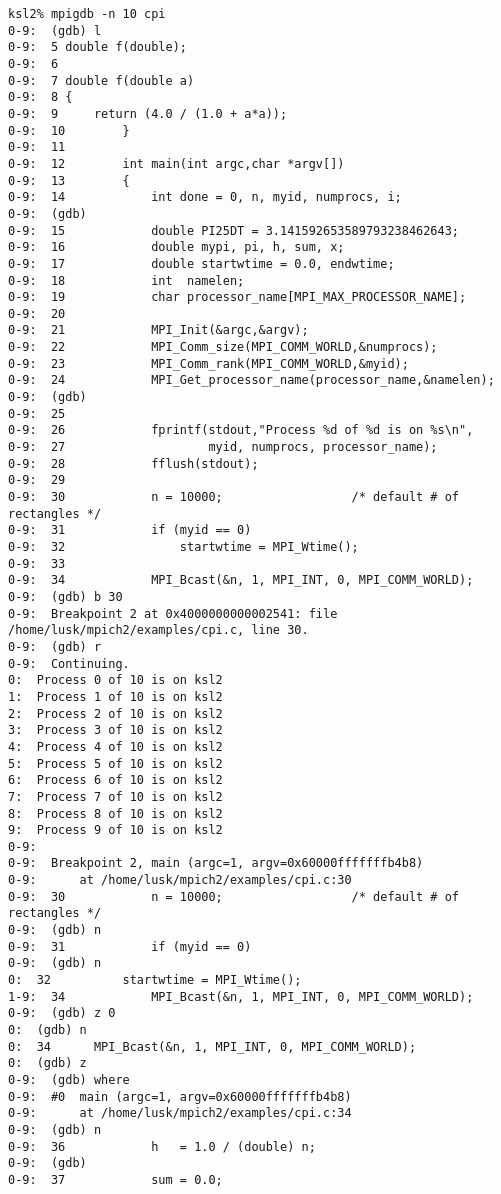\documentclass[dvipdfm,11pt]{article}
\begin{document}
%
\begin{tiny}
\begin{verbatim}
ksl2% mpigdb -n 10 cpi
0-9:  (gdb) l
0-9:  5 double f(double);
0-9:  6 
0-9:  7 double f(double a)
0-9:  8 {
0-9:  9     return (4.0 / (1.0 + a*a));
0-9:  10        }
0-9:  11        
0-9:  12        int main(int argc,char *argv[])
0-9:  13        {
0-9:  14            int done = 0, n, myid, numprocs, i;
0-9:  (gdb) 
0-9:  15            double PI25DT = 3.141592653589793238462643;
0-9:  16            double mypi, pi, h, sum, x;
0-9:  17            double startwtime = 0.0, endwtime;
0-9:  18            int  namelen;
0-9:  19            char processor_name[MPI_MAX_PROCESSOR_NAME];
0-9:  20        
0-9:  21            MPI_Init(&argc,&argv);
0-9:  22            MPI_Comm_size(MPI_COMM_WORLD,&numprocs);
0-9:  23            MPI_Comm_rank(MPI_COMM_WORLD,&myid);
0-9:  24            MPI_Get_processor_name(processor_name,&namelen);
0-9:  (gdb) 
0-9:  25        
0-9:  26            fprintf(stdout,"Process %d of %d is on %s\n",
0-9:  27                    myid, numprocs, processor_name);
0-9:  28            fflush(stdout);
0-9:  29        
0-9:  30            n = 10000;                  /* default # of rectangles */
0-9:  31            if (myid == 0)
0-9:  32                startwtime = MPI_Wtime();
0-9:  33        
0-9:  34            MPI_Bcast(&n, 1, MPI_INT, 0, MPI_COMM_WORLD);
0-9:  (gdb) b 30
0-9:  Breakpoint 2 at 0x4000000000002541: file /home/lusk/mpich2/examples/cpi.c, line 30.
0-9:  (gdb) r
0-9:  Continuing.
0:  Process 0 of 10 is on ksl2
1:  Process 1 of 10 is on ksl2
2:  Process 2 of 10 is on ksl2
3:  Process 3 of 10 is on ksl2
4:  Process 4 of 10 is on ksl2
5:  Process 5 of 10 is on ksl2
6:  Process 6 of 10 is on ksl2
7:  Process 7 of 10 is on ksl2
8:  Process 8 of 10 is on ksl2
9:  Process 9 of 10 is on ksl2
0-9:  
0-9:  Breakpoint 2, main (argc=1, argv=0x60000fffffffb4b8)
0-9:      at /home/lusk/mpich2/examples/cpi.c:30
0-9:  30            n = 10000;                  /* default # of rectangles */
0-9:  (gdb) n
0-9:  31            if (myid == 0)
0-9:  (gdb) n
0:  32          startwtime = MPI_Wtime();
1-9:  34            MPI_Bcast(&n, 1, MPI_INT, 0, MPI_COMM_WORLD);
0-9:  (gdb) z 0
0:  (gdb) n
0:  34      MPI_Bcast(&n, 1, MPI_INT, 0, MPI_COMM_WORLD);
0:  (gdb) z
0-9:  (gdb) where
0-9:  #0  main (argc=1, argv=0x60000fffffffb4b8)
0-9:      at /home/lusk/mpich2/examples/cpi.c:34
0-9:  (gdb) n
0-9:  36            h   = 1.0 / (double) n;
0-9:  (gdb) 
0-9:  37            sum = 0.0;

\end{verbatim}
\end{tiny}
\end{document}
